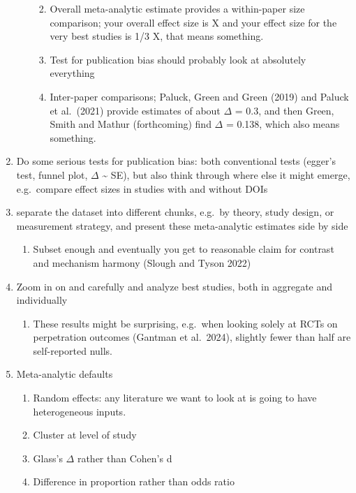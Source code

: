 \documentclass[
  man]{apa6}
\providecommand{\tightlist}{%
  \setlength{\itemsep}{0pt}\setlength{\parskip}{0pt}}
\begin{document}
\begin{enumerate}
\begin{enumerate}
    \begin{enumerate}
    \def\labelenumiii{\arabic{enumiii}.}
    \setcounter{enumiii}{3}
    \tightlist
    \item
      Overall meta-analytic estimate provides a within-paper size comparison; your overall effect size is X and your effect size for the very best studies is 1/3 X, that means something.
    \item
      Test for publication bias should probably look at absolutely everything
    \item
      Inter-paper comparisons; Paluck, Green and Green (2019) and Paluck et al.~(2021) provide estimates of about \(\Delta\) = 0.3, and then Green, Smith and Mathur (forthcoming) find \(\Delta\) = 0.138, which also means something.
    \end{enumerate}
  \end{enumerate}
\item
  Do some serious tests for publication bias: both conventional tests (egger's test, funnel plot, \(\Delta\) \textasciitilde{} SE), but also think through where else it might emerge, e.g.~compare effect sizes in studies with and without DOIs
\item
  separate the dataset into different chunks, e.g.~by theory, study design, or measurement strategy, and present these meta-analytic estimates side by side

  \begin{enumerate}
  \def\labelenumii{\arabic{enumii}.}
  \setcounter{enumii}{3}
  \tightlist
  \item
    Subset enough and eventually you get to reasonable claim for contrast and mechanism harmony (Slough and Tyson 2022)
  \end{enumerate}
\item
  Zoom in on and carefully and analyze best studies, both in aggregate and individually

  \begin{enumerate}
  \def\labelenumii{\arabic{enumii}.}
  \setcounter{enumii}{4}
  \tightlist
  \item
    These results might be surprising, e.g.~when looking solely at RCTs on perpetration outcomes (Gantman et al.~2024), slightly fewer than half are self-reported nulls.
  \end{enumerate}
\item
  Meta-analytic defaults

  \begin{enumerate}
  \def\labelenumii{\arabic{enumii}.}
  \setcounter{enumii}{5}
  \tightlist
  \item
    Random effects: any literature we want to look at is going to have heterogeneous inputs.
  \item
    Cluster at level of study
  \item
    Glass's \(\Delta\) rather than Cohen's d
  \item
    Difference in proportion rather than odds ratio


\end{enumerate}
\end{enumerate}
\end{document}
